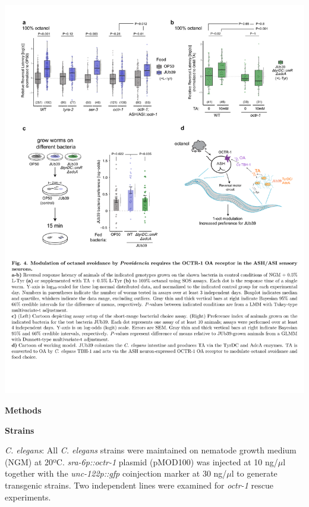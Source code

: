 \documentclass[11pt,]{article}
\begin{document}
\begin{center}\includegraphics[width=1.05\linewidth]{Figure4} \end{center}

\vskip 0.2in \vskip 0.2in

\begin{center}
\textbf{Methods}
\end{center}

\noindent \textbf{Strains}

\emph{C. elegans}: All \emph{C. elegans} strains were maintained on
nematode growth medium (NGM) at 20ºC. \emph{sra-6p::octr-1} plasmid
(pMOD100) was injected at 10 ng/\(\mu\)l together with the
\emph{unc-122p::gfp} coinjection marker at 30 ng/\(\mu\)l to generate
transgenic strains. Two independent lines were examined for
\emph{octr-1} rescue experiments.
\end{document}
